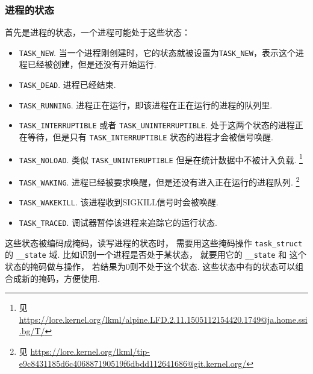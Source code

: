 \subsubsection{进程的状态} \label{process state}
首先是进程的状态，一个进程可能处于这些状态：
\begin{itemize}
	\item \lstinline{TASK_NEW}.
	      当一个进程刚创建时，它的状态就被设置为\lstinline{TASK_NEW}，表示这个进程已经被创建，但是还没有开始运行.
	\item \lstinline{TASK_DEAD}.
	      进程已经结束.
	\item \lstinline{TASK_RUNNING}.
	      进程正在运行，即该进程在正在运行的进程的队列里.
	\item \lstinline{TASK_INTERRUPTIBLE} 或者 \lstinline{TASK_UNINTERRUPTIBLE}.
	      处于这两个状态的进程正在等待，但是只有 \lstinline{TASK_INTERRUPTIBLE} 状态的进程才会被信号唤醒.
	\item \lstinline{TASK_NOLOAD}.
	      类似 \lstinline{TASK_UNINTERUPTIBLE} 但是在统计数据中不被计入负载.
	      \footnote{见 \url{https://lore.kernel.org/lkml/alpine.LFD.2.11.1505112154420.1749@ja.home.ssi.bg/T/}}
	\item \lstinline{TASK_WAKING}.
	      进程已经被要求唤醒，但是还没有进入正在运行的进程队列.
	      \footnote{见 \url{https://lore.kernel.org/lkml/tip-e9c8431185d6c406887190519f6dbdd112641686@git.kernel.org/}}
	\item \lstinline{TASK_WAKEKILL}.
	      该进程收到SIGKILL信号时会被唤醒.
	\item \lstinline{TASK_TRACED}.
	      调试器暂停该进程来追踪它的运行状态.
\end{itemize}
这些状态被编码成掩码，读写进程的状态时，
需要用这些掩码操作 \lstinline{task_struct} 的 \lstinline{__state} 域.
比如识别一个进程是否处于某状态，
就要用它的 \lstinline{__state} 和 这个状态的掩码做与操作，
若结果为0则不处于这个状态.
这些状态中有的状态可以组合成新的掩码，方便使用.

